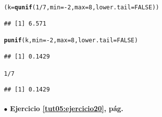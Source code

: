 \documentclass[10pt,a4paper]{article}\usepackage[]{graphicx}\usepackage[]{color}
\makeatletter
\newcommand{\hlnum}[1]{\textcolor[rgb]{0.686,0.059,0.569}{#1}}%
\newcommand{\hlopt}[1]{\textcolor[rgb]{0,0,0}{#1}}%
\newcommand{\hlstd}[1]{\textcolor[rgb]{0.345,0.345,0.345}{#1}}%
\newcommand{\hlkwb}[1]{\textcolor[rgb]{0.69,0.353,0.396}{#1}}%
\newcommand{\hlkwc}[1]{\textcolor[rgb]{0.333,0.667,0.333}{#1}}%
\newcommand{\hlkwd}[1]{\textcolor[rgb]{0.737,0.353,0.396}{\textbf{#1}}}%
\newenvironment{kframe}{%
 \def\at@end@of@kframe{}%
 \ifinner\ifhmode%
  \def\at@end@of@kframe{\end{minipage}}%
  \begin{minipage}{\columnwidth}%
 \fi\fi%
 \def\FrameCommand##1{\hskip\@totalleftmargin \hskip-\fboxsep
 \colorbox{shadecolor}{##1}\hskip-\fboxsep
     \hskip-\linewidth \hskip-\@totalleftmargin \hskip\columnwidth}%
 \MakeFramed {\advance\hsize-\width
   \@totalleftmargin\z@ \linewidth\hsize
   \@setminipage}}%
 {\par\unskip\endMakeFramed%
 \at@end@of@kframe}
\newenvironment{knitrout}{}{} %
\makeatother
\begin{document}
\begin{knitrout}
\color{fgcolor}\begin{kframe}
\begin{alltt}
\hlstd{(k} \hlkwb{=} \hlkwd{qunif}\hlstd{(}\hlnum{1}\hlopt{/}\hlnum{7}\hlstd{,} \hlkwc{min}\hlstd{=}\hlopt{-}\hlnum{2}\hlstd{,} \hlkwc{max}\hlstd{=}\hlnum{8}\hlstd{,} \hlkwc{lower.tail}\hlstd{=}\hlnum{FALSE}\hlstd{))}
\end{alltt}
\begin{verbatim}
## [1] 6.571
\end{verbatim}
\begin{alltt}
\hlkwd{punif}\hlstd{(k,} \hlkwc{min}\hlstd{=}\hlopt{-}\hlnum{2}\hlstd{,} \hlkwc{max}\hlstd{=}\hlnum{8}\hlstd{,} \hlkwc{lower.tail}\hlstd{=}\hlnum{FALSE}\hlstd{)}
\end{alltt}
\begin{verbatim}
## [1] 0.1429
\end{verbatim}
\begin{alltt}
\hlnum{1}\hlopt{/}\hlnum{7}
\end{alltt}
\begin{verbatim}
## [1] 0.1429
\end{verbatim}
\end{kframe}
\end{knitrout}


\paragraph{\bf $\bullet$ Ejercicio \ref{tut05:ejercicio20}, pág. \pageref{tut05:ejercicio20}}
\label{tut05:ejercicio20:sol}\quad\\
\end{document}
